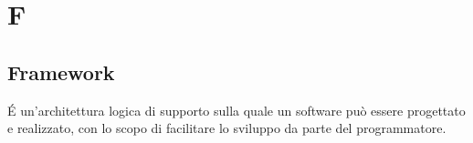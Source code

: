 \section{F}
\subsection{Framework}
É un'architettura logica di supporto sulla quale un software può essere progettato e realizzato, con lo scopo di facilitare lo sviluppo da parte del programmatore.
\clearpage